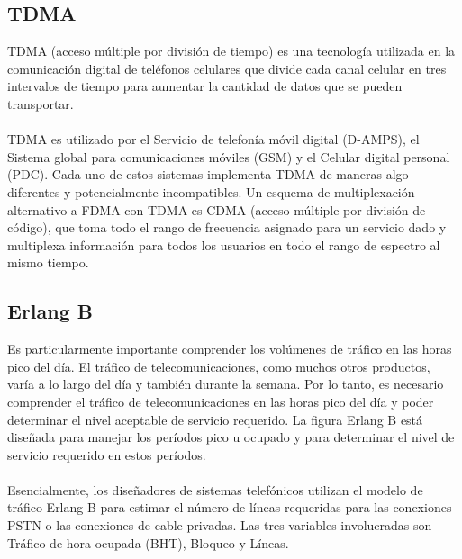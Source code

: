 \documentclass[11pt,letterpaper]{article}
\begin{document}
\subsection{TDMA}
TDMA (acceso múltiple por división de tiempo) es una tecnología utilizada en la comunicación 
digital de teléfonos celulares que divide cada canal celular en tres intervalos de tiempo 
para aumentar la cantidad de datos que se pueden transportar.
\\ \\
TDMA es utilizado por el Servicio de telefonía móvil digital (D-AMPS), 
el Sistema global para comunicaciones móviles (GSM) y el Celular digital personal (PDC). 
Cada uno de estos sistemas implementa TDMA de maneras algo diferentes y potencialmente 
incompatibles. Un esquema de multiplexación alternativo a FDMA con TDMA es CDMA (acceso 
múltiple por división de código), que toma todo el rango de frecuencia asignado para un 
servicio dado y multiplexa información para todos los usuarios en todo el rango de 
espectro al mismo tiempo.

\subsection{Erlang B}
Es particularmente importante comprender los volúmenes de tráfico en las horas pico del 
día. El tráfico de telecomunicaciones, como muchos otros productos, varía a lo largo del 
día y también durante la semana. Por lo tanto, es necesario comprender el tráfico de 
telecomunicaciones en las horas pico del día y poder determinar el nivel aceptable de 
servicio requerido. La figura Erlang B está diseñada para manejar los períodos pico u 
ocupado y para determinar el nivel de servicio requerido en estos períodos.
\\ \\
Esencialmente, los diseñadores de sistemas telefónicos utilizan el modelo de tráfico 
Erlang B para estimar el número de líneas requeridas para las conexiones PSTN o las 
conexiones de cable privadas. Las tres variables involucradas son Tráfico de hora ocupada 
(BHT), Bloqueo y Líneas.
\end{document}
